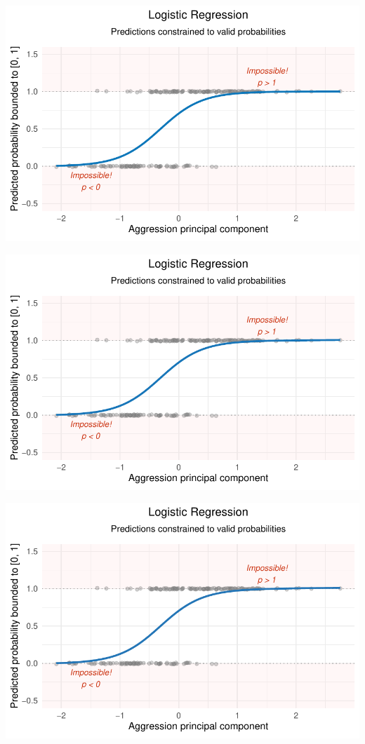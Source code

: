 \documentclass[
  letterpaper,
  DIV=11,
  numbers=noendperiod]{scrartcl}
\begin{document}
\begin{center}
\includegraphics[width=0.8\linewidth,height=\textheight,keepaspectratio]{Beyond!!!_files/figure-pdf/unnamed-chunk-4-75.pdf}
\end{center}

\begin{center}
\includegraphics[width=0.8\linewidth,height=\textheight,keepaspectratio]{Beyond!!!_files/figure-pdf/unnamed-chunk-4-76.pdf}
\end{center}

\begin{center}
\includegraphics[width=0.8\linewidth,height=\textheight,keepaspectratio]{Beyond!!!_files/figure-pdf/unnamed-chunk-4-77.pdf}
\end{center}
\end{document}
